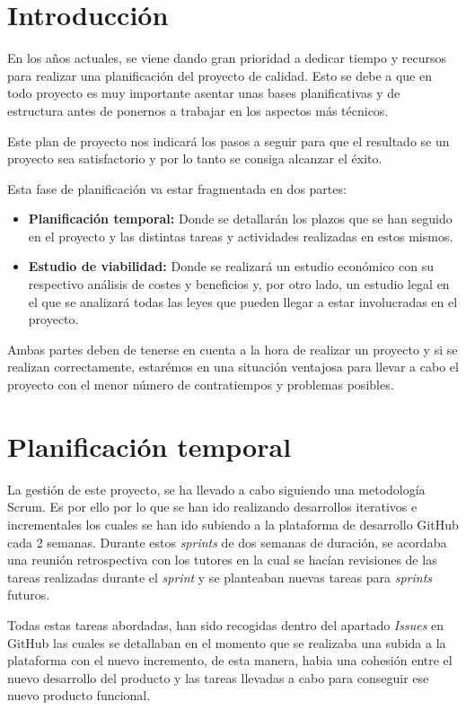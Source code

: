 
\section{Introducción}
En los años actuales, se viene dando gran prioridad a dedicar tiempo y recursos para realizar una  planificación del proyecto de calidad. Esto se debe a que en todo proyecto es muy importante asentar unas bases planificativas y de estructura antes de ponernos a trabajar en los aspectos más técnicos.

Este plan de proyecto nos indicará los pasos a seguir para que el resultado se un proyecto sea satisfactorio y por lo tanto se consiga alcanzar el éxito.

Esta fase de planificación va estar fragmentada en dos partes:
\begin{itemize}
\item 
\textbf{Planificación temporal: } Donde se detallarán los plazos que se han seguido en el proyecto y las distintas tareas y actividades realizadas en estos mismos.
\item 
\textbf{Estudio de viabilidad: } Donde se realizará un estudio económico con su respectivo análisis de costes y beneficios y, por otro lado, un estudio legal en el que se analizará todas las leyes que pueden llegar a estar involucradas en el proyecto.
\end{itemize}

Ambas partes deben de tenerse en cuenta a la hora de realizar un proyecto y si se realizan correctamente, estarémos en una situación ventajosa para llevar a cabo el proyecto con el menor número de contratiempos y problemas posibles. 
\section{Planificación temporal}
La gestión de este proyecto, se ha llevado a cabo siguiendo una metodología Scrum. Es por ello por lo que se han ido realizando desarrollos iterativos e incrementales los cuales se han ido subiendo a la plataforma de desarrollo GitHub cada 2 semanas. Durante estos \textit{sprints} de dos semanas de duración, se acordaba una reunión retrospectiva con los tutores en la cual se hacían revisiones de las tareas realizadas durante el \textit{sprint} y se planteaban nuevas tareas para \textit{sprints} futuros.

Todas estas tareas abordadas, han sido recogidas dentro del apartado \textit{Issues} en GitHub las cuales se detallaban en el momento que se realizaba una subida a la plataforma con el nuevo incremento, de esta manera, habia una cohesión entre el nuevo desarrollo del producto y las tareas llevadas a cabo para conseguir ese nuevo producto funcional.

